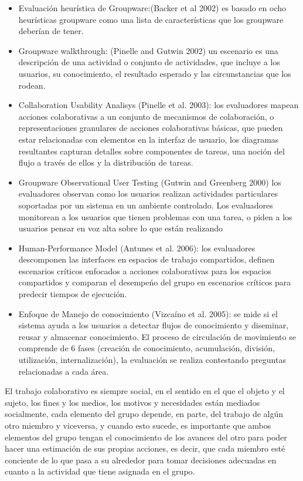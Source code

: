 \begin{itemize}
\item Evaluaci\'on heur\'istica de Groupware:(Backer et al 2002) es basado en ocho heur\'isticas groupware como una lista de caracter\'isticas que los groupware deber\'ian de tener.
\item Groupware walkthrough: (Pinelle and Gutwin 2002) un escenario es una descripci\'on de una actividad o conjunto de actividades, que incluye a los usuarios, su conocimiento, el resultado esperado y las circunstancias que los rodean.
\item Collaboration Usability Analisys (Pinelle et al. 2003): los evaluadores mapean acciones colaborativas a un conjunto de mecanismos de colaboraci\'on, o representaciones granulares de acciones colaborativas b\'asicas, que pueden estar relacionadas con elementos en la interfaz de usuario, los diagramas resultantes capturan detalles sobre componentes de tareas, una noci\'on del flujo a trav\'es de ellos y la distribuci\'on de tareas.
\item Groupware Observational User Testing (Gutwin and Greenberg 2000) los evaluadores observan como los usuarios realizan actividades particulares soportadas por un sistema en un ambiente controlado. Los evaluadores monitorean a los usuarios que tienen problemas con una tarea, o piden a los usuarios pensar en voz alta sobre lo que est\'an realizando
\item Human-Performance Model (Antunes et al. 2006): los evaluadores descomponen las interfaces en espacios de trabajo compartidos, definen escenarios cr\'iticos enfocados a acciones colaborativas para los espacios compartidos y comparan el desempe\'no del grupo en escenarios cr\'iticos para predecir tiempos de ejecuci\'on.
\item Enfoque de Manejo de conocimiento (Vizca\'ino et al. 2005): se mide si el sistema ayuda a los usuarios a detectar flujos de conocimiento y diseminar, reusar y almacenar conocimiento. El proceso de circulaci\'on de movimiento se comprende de 6 fases (creaci\'on de conocimiento, acumulaci\'on, divisi\'on, utilizaci\'on, internalizaci\'on), la evaluaci\'on se realiza contestando preguntas relacionadas a cada \'area.
\end{itemize}

El trabajo colaborativo es siempre social, en el sentido en el que el objeto y el sujeto, los fines y los medios, los motivos y necesidades est\'an mediados socialmente\citep{schmidt1992taking}, cada elemento del grupo depende, en parte, del trabajo de alg\'un otro miembro y viceversa, y cuando esto sucede, es importante que ambos elementos del grupo tengan el conocimiento de los avances del otro para poder hacer una estimaci\'on de sus propias acciones, es decir, que cada miembro est\'e conciente de lo que pasa a su alrededor para tomar decisiones adecuadas en cuanto a la actividad que tiene asignada en el grupo.

